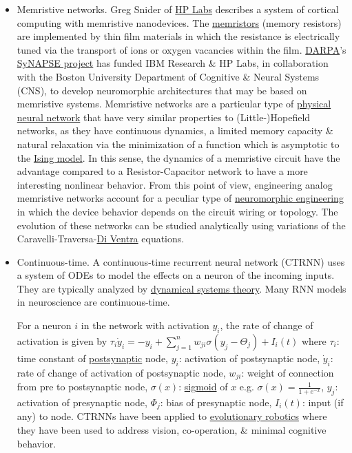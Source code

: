 \documentclass{article}
\begin{document}
\begin{itemize}
	\item {\sf Memristive networks.} {\sc Greg Snider} of \href{https://en.wikipedia.org/wiki/HP_Labs}{HP Labs} describes a system of cortical computing with memristive nanodevices. The \href{https://en.wikipedia.org/wiki/Memristors}{memristors} (memory resistors) are implemented by thin film materials in which the resistance is electrically tuned via the transport of ions or oxygen vacancies within the film. \href{https://en.wikipedia.org/wiki/DARPA}{DARPA}'s \href{https://en.wikipedia.org/wiki/SyNAPSE}{SyNAPSE project} has funded IBM Research \& HP Labs, in collaboration with the Boston University Department of Cognitive \& Neural Systems (CNS), to develop neuromorphic architectures that may be based on memristive systems. Memristive networks are a particular type of \href{https://en.wikipedia.org/wiki/Physical_neural_network}{physical neural network} that have very similar properties to (Little-)Hopefield networks, as they have continuous dynamics, a limited memory capacity \& natural relaxation via the minimization of a function which is asymptotic to the \href{https://en.wikipedia.org/wiki/Ising_model}{Ising model}. In this sense, the dynamics of a memristive circuit have the advantage compared to a Resistor-Capacitor network to have a more interesting nonlinear behavior. From this point of view, engineering analog memristive networks account for a peculiar type of \href{https://en.wikipedia.org/wiki/Neuromorphic_engineering}{neuromorphic engineering} in which the device behavior depends on the circuit wiring or topology. The evolution of these networks can be studied analytically using variations of the Caravelli-Traversa-\href{https://en.wikipedia.org/wiki/Di_Ventra}{Di Ventra} equations.
	\item {\sf Continuous-time.} A continuous-time recurrent neural network (CTRNN) uses a system of ODEs to model the effects on a neuron of the incoming inputs. They are typically analyzed by \href{https://en.wikipedia.org/wiki/Dynamical_systems_theory}{dynamical systems theory}. Many RNN models in neuroscience are continuous-time.
	
	For a neuron $i$ in the network with activation $y_i$, the rate of change of activation is given by $\tau_i\dot{y}_i = -y_i + \sum_{j=1}^n w_{ji}\sigma(y_j - \Theta_j) + I_i(t)$ where $\tau_i$: time constant of \href{https://en.wikipedia.org/wiki/Synapse}{postsynaptic} node, $y_i$: activation of postsynaptic node, $\dot{y}_i$: rate of change of activation of postsynaptic node, $w_{ji}$: weight of connection from pre to postsynaptic node, $\sigma(x)$: \href{https://en.wikipedia.org/wiki/Sigmoid_function}{sigmoid} of $x$ e.g. $\sigma(x) = \frac{1}{1 + e^{-x}}$, $y_j$: activation of presynaptic node, $\Phi_j$: bias of presynaptic node, $I_i(t)$: input (if any) to node. CTRNNs have been applied to \href{https://en.wikipedia.org/wiki/Evolutionary_robotics}{evolutionary robotics} where they have been used to address vision, co-operation, \& minimal cognitive behavior.
	

\end{itemize}
\end{document}
